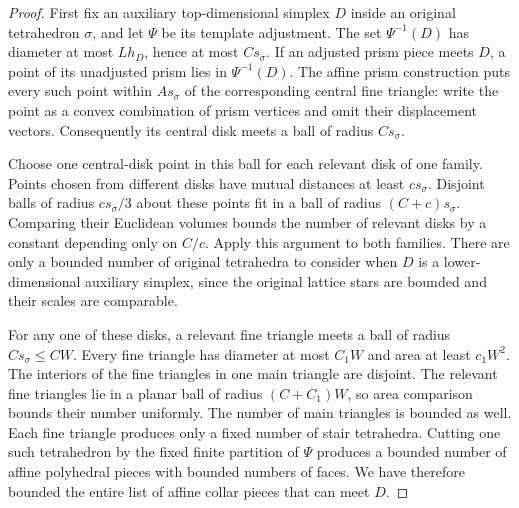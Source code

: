 \begin{proof}
First fix an auxiliary top-dimensional simplex $D$ inside an original
tetrahedron $\sigma$, and let $\Psi$ be its template adjustment.  The
set $\Psi^{-1}(D)$ has diameter at most $L h_D$, hence at most
$C s_\sigma$.  If an adjusted prism piece meets $D$, a point of its
unadjusted prism lies in $\Psi^{-1}(D)$.  The affine prism construction
puts every such point within $A s_\sigma$ of the corresponding central
fine triangle: write the point as a convex combination of prism
vertices and omit their displacement vectors.  Consequently its
central disk meets a ball of radius $C s_\sigma$.

Choose one central-disk point in this ball for each relevant disk of
one family.  Points chosen from different disks have mutual distances
at least $c s_\sigma$.  Disjoint balls of radius $c s_\sigma/3$ about
these points fit in a ball of radius $(C+c)s_\sigma$.  Comparing their
Euclidean volumes bounds the number of relevant disks by a constant
depending only on $C/c$.  Apply this argument to both families.
There are only a bounded number of original tetrahedra to consider
when $D$ is a lower-dimensional auxiliary simplex, since the original
lattice stars are bounded and their scales are comparable.

For any one of these disks, a relevant fine triangle meets a ball of
radius $C s_\sigma\leq C W$.  Every fine triangle has diameter at most
$C_1W$ and area at least $c_1W^2$.  The interiors of the fine triangles
in one main triangle are disjoint.  The relevant fine triangles lie
in a planar ball of radius $(C+C_1)W$, so area comparison bounds their
number uniformly.  The number of main triangles is bounded as well.
Each fine triangle produces only a fixed number of stair tetrahedra.
Cutting one such tetrahedron by the fixed finite partition of $\Psi$
produces a bounded number of affine polyhedral pieces with bounded
numbers of faces.  We have therefore bounded the entire list of
affine collar pieces that can meet $D$.


\end{proof}
